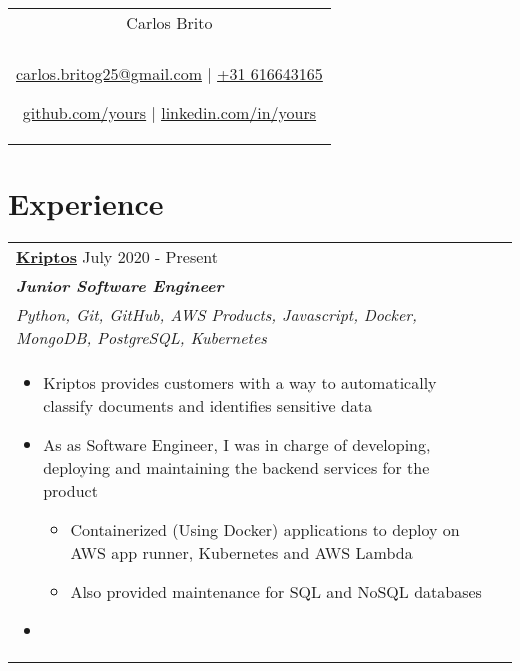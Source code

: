 \documentclass[a4paper,8pt]{article}
\begin{document}
\pagestyle{empty} 


\begin{tabularx}{\linewidth}{@{} C @{}}
\color[HTML]{1C033C} \Huge{Carlos Brito} \\[6pt]
\\
\textcolor[HTML]{371e77}{\underline{\href{mailto:your@email.com}{\raisebox{-0.05\height}{\faEnvelope} carlos.britog25@gmail.com}} $|$}
\textcolor[HTML]{371e77}{\href{tel:+525513219900}{\raisebox{-0.05\height}{\faMobile} +31 616643165}}

\textcolor[HTML]{371e77}{\underline{\href{https://github.com/yours}{\raisebox{-0.05\height}{\faGithub} github.com/yours}} $|$}
\textcolor[HTML]{371e77}{\underline{\href{https://linkedin.com/in/yours}{\raisebox{-0.05\height}{\faLinkedin} linkedin.com/in/yours}}}
\end{tabularx}

\section{Experience}
\begin{tabularx}{\linewidth}{ @{}l r@{} }
\textbf{\uline{\href{https://www.kriptos.io/en/home}{Kriptos}}} \hfill \color[HTML]{371e77} July 2020 - Present \\[4pt]
\color[HTML]{371e77}\textbf{\textit{Junior Software Engineer}}\ \hfill \color[HTML]{4B28A4} \\ \textit{Python, Git, GitHub, AWS Products, Javascript, Docker, MongoDB, PostgreSQL, Kubernetes} \\[5pt]
\begin{minipage}[t]{\linewidth}
    \begin{itemize}[nosep,after=\strut, leftmargin=2em, itemsep=2pt]
        \item Kriptos provides customers with a way to automatically classify documents and identifies sensitive data
        \item As as Software Engineer, I was in charge of developing, deploying and maintaining the backend services for the product
        \begin{itemize}[nosep,after=\strut, leftmargin=2em, itemsep=2pt]
            \item Containerized (Using Docker) applications to deploy on AWS app runner, Kubernetes and AWS Lambda
            \item Also provided maintenance for SQL and NoSQL databases
        \end{itemize}
        \item 
    \end{itemize}
\end{minipage}
\end{tabularx}
\end{document}
